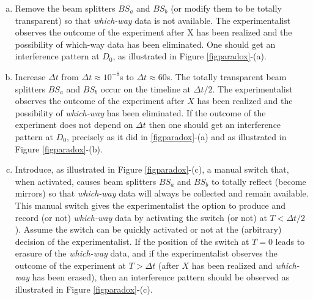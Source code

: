 \documentclass[11pt]{article}
\theoremstyle{definition}
\begin{document}
\begin{enumerate}[(a)]
\item Remove the beam splitters $BS_a$ and $BS_b$ (or modify them to be totally transparent) so that \emph{which-way} data is not available. The experimentalist observes the outcome of the experiment after X has been realized and the possibility of which-way data has been eliminated. One should get an interference pattern at $D_0$, as illustrated in Figure \ref{figparadox}-(a).
\item Increase $\Delta t$ from $\Delta t \approx 10^{-8}$s to $\Delta t \approx 60$s. The totally transparent beam splitters $BS_a$ and $BS_b$ occur on the timeline at $\Delta t/2$.  The experimentalist observes the outcome of the experiment after $X$ has been realized and the possibility of \emph{which-way} has been eliminated. If the outcome of the experiment does not depend on $\Delta t$ then one should get an interference pattern at $D_0$, precisely as it did in \ref{figparadox}-(a) and as illustrated in Figure \ref{figparadox}-(b).

\item
Introduce, as illustrated in Figure \ref{figparadox}-(c), a manual switch that, when activated, causes beam splitters $BS_a$ and $BS_b$ to totally reflect (become mirrors) so that \emph{which-way} data will always be collected and remain available.  This manual switch gives the experimentalist the option to produce and record (or not) \emph{which-way} data by activating the switch (or not) at $T < \Delta t/2$).
Assume the switch can be quickly activated or not at the (arbitrary) decision of the experimentalist.
If the position of the switch at $T=0$ leads to erasure of the \emph{which-way} data,  and if the experimentalist observes the outcome of the experiment at $T>\Delta t$ (after $X$ has been realized and \emph{which-way} has been erased), then  an interference pattern should be observed as illustrated in Figure \ref{figparadox}-(c).


\end{enumerate}
\end{document}
